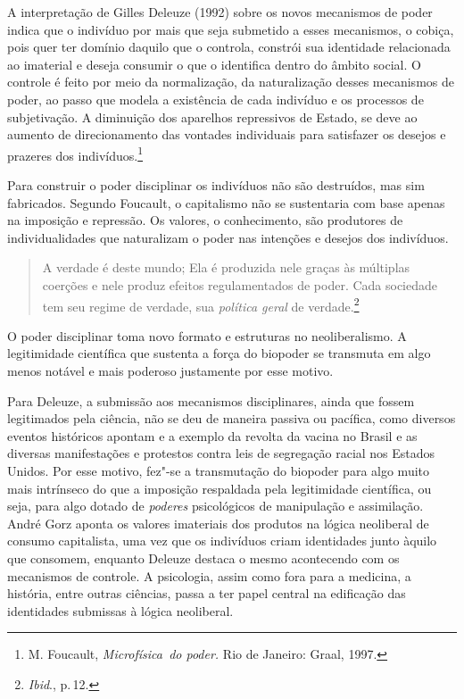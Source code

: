 A interpretação de Gilles Deleuze (1992) sobre os novos mecanismos de
poder indica que o indivíduo por mais que seja submetido a esses
mecanismos, o cobiça, pois quer ter domínio daquilo que o controla,
constrói sua identidade relacionada ao imaterial e deseja consumir o que
o identifica dentro do âmbito social. O controle é feito por meio da
normalização, da naturalização desses mecanismos de poder, ao passo que
modela a existência de cada indivíduo e os processos de subjetivação. A
diminuição dos aparelhos repressivos de Estado, se deve ao aumento de
direcionamento das vontades individuais para satisfazer os desejos e
prazeres dos indivíduos.\footnote{M. Foucault, \textit{Microfísica~do poder.} Rio de Janeiro: Graal, 1997.}

Para construir o poder disciplinar os indivíduos não são destruídos,
mas sim fabricados. Segundo Foucault, o capitalismo não se sustentaria
com base apenas na imposição e repressão. Os valores, o conhecimento,
são produtores de individualidades que naturalizam o poder nas intenções
e desejos dos indivíduos.

\begin{quote}
A verdade é deste mundo; Ela é produzida nele graças às múltiplas
coerções e nele produz efeitos regulamentados de poder. Cada sociedade
tem seu regime de verdade, sua \textit{política geral} de verdade.\footnote{\textit{Ibid}., p.\,12.}
\end{quote}

O poder disciplinar toma novo formato e estruturas no neoliberalismo. A
legitimidade científica que sustenta a força do biopoder se transmuta em
algo menos notável e mais poderoso justamente por esse motivo.

Para Deleuze, a submissão aos mecanismos disciplinares, ainda que fossem
legitimados pela ciência, não se deu de maneira passiva ou pacífica,
como diversos eventos históricos apontam e a exemplo da revolta da
vacina no Brasil e as diversas manifestações e protestos contra leis de
segregação racial nos Estados Unidos. Por esse motivo, fez"-se a
transmutação do biopoder para algo muito mais intrínseco do que a
imposição respaldada pela legitimidade científica, ou seja, para algo
dotado de \textit{poderes} psicológicos de manipulação e assimilação. André
Gorz aponta os valores imateriais dos produtos na lógica neoliberal de
consumo capitalista, uma vez que os indivíduos criam identidades junto
àquilo que consomem, enquanto Deleuze destaca o mesmo acontecendo com os
mecanismos de controle. A psicologia, assim como fora para a medicina, a
história, entre outras ciências, passa a ter papel central na edificação
das identidades submissas à lógica neoliberal.

